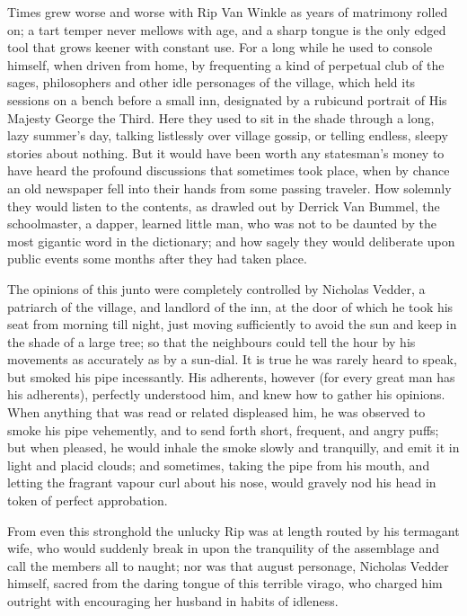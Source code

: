 Times grew worse and worse with Rip Van Winkle as years of matrimony rolled on; a tart temper never mellows with age, and a sharp tongue is the only edged tool that grows keener with constant use. For a long while he used to console himself, when driven from home, by frequenting a kind of perpetual club of the sages, philosophers and other idle personages of the village, which held its sessions on a bench before a small inn, designated by a rubicund portrait of His Majesty George the Third. Here they used to sit in the shade through a long, lazy summer’s day, talking listlessly over village gossip, or telling endless, sleepy stories about nothing. But it would have been worth any statesman’s money to have heard the profound discussions that sometimes took place, when by chance an old newspaper fell into their hands from some passing traveler. How solemnly they would listen to the contents, as drawled out by Derrick Van Bummel, the schoolmaster, a dapper, learned little man, who was not to be daunted by the most gigantic word in the dictionary; and how sagely they would deliberate upon public events some months after they had taken place.

The opinions of this junto were completely controlled by Nicholas Vedder, a patriarch of the village, and landlord of the inn, at the door of which he took his seat from morning till night, just moving sufficiently to avoid the sun and keep in the shade of a large tree; so that the neighbours could tell the hour by his movements as accurately as by a sun-dial. It is true he was rarely heard to speak, but smoked his pipe incessantly. His adherents, however (for every great man has his adherents), perfectly understood him, and knew how to gather his opinions. When anything that was read or related displeased him, he was observed to smoke his pipe vehemently, and to send forth short, frequent, and angry puffs; but when pleased, he would inhale the smoke slowly and tranquilly, and emit it in light and placid clouds; and sometimes, taking the pipe from his mouth, and letting the fragrant vapour curl about his nose, would gravely nod his head in token of perfect approbation.

From even this stronghold the unlucky Rip was at length routed by his termagant wife, who would suddenly break in upon the tranquility of the assemblage and call the members all to naught; nor was that august personage, Nicholas Vedder himself, sacred from the daring tongue of this terrible virago, who charged him outright with encouraging her husband in habits of idleness.

